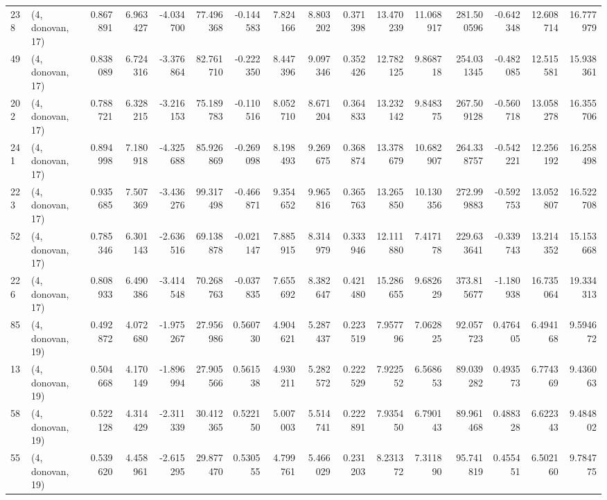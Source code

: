 \begin{tabular}{llrrrrrrrrrrrrrr}
238 &  (4, donovan, 17) &   0.867891 &   6.963427 & -4.034700 &   77.496368 & -0.144583 &   7.824166 &   8.803202 &  0.371398 &  13.470239 &  11.068917 &  281.500596 & -0.642348 &  12.608714 &  16.777979 \\
49  &  (4, donovan, 17) &   0.838089 &   6.724316 & -3.376864 &   82.761710 & -0.222350 &   8.447396 &   9.097346 &  0.352426 &  12.782125 &   9.868718 &  254.031345 & -0.482085 &  12.515581 &  15.938361 \\
202 &  (4, donovan, 17) &   0.788721 &   6.328215 & -3.216153 &   75.189783 & -0.110516 &   8.052710 &   8.671204 &  0.364833 &  13.232142 &   9.848375 &  267.509128 & -0.560718 &  13.058278 &  16.355706 \\
241 &  (4, donovan, 17) &   0.894998 &   7.180918 & -4.325688 &   85.926869 & -0.269098 &   8.198493 &   9.269675 &  0.368874 &  13.378679 &  10.682907 &  264.338757 & -0.542221 &  12.256192 &  16.258498 \\
223 &  (4, donovan, 17) &   0.935685 &   7.507369 & -3.436276 &   99.317498 & -0.466871 &   9.354652 &   9.965816 &  0.365763 &  13.265850 &  10.130356 &  272.999883 & -0.592753 &  13.052807 &  16.522708 \\
52  &  (4, donovan, 17) &   0.785346 &   6.301143 & -2.636516 &   69.138878 & -0.021147 &   7.885915 &   8.314979 &  0.333946 &  12.111880 &   7.417178 &  229.633641 & -0.339743 &  13.214352 &  15.153668 \\
226 &  (4, donovan, 17) &   0.808933 &   6.490386 & -3.414548 &   70.268763 & -0.037835 &   7.655692 &   8.382647 &  0.421480 &  15.286655 &   9.682629 &  373.815677 & -1.180938 &  16.735064 &  19.334313 \\
85  &  (4, donovan, 19) &   0.492872 &   4.072680 & -1.975267 &   27.956986 &  0.560730 &   4.904621 &   5.287437 &  0.223519 &   7.957796 &   7.062825 &   92.057723 &  0.476405 &   6.494168 &   9.594672 \\
13  &  (4, donovan, 19) &   0.504668 &   4.170149 & -1.896994 &   27.905566 &  0.561538 &   4.930211 &   5.282572 &  0.222529 &   7.922552 &   6.568653 &   89.039282 &  0.493573 &   6.774369 &   9.436063 \\
58  &  (4, donovan, 19) &   0.522128 &   4.314429 & -2.311339 &   30.412365 &  0.522150 &   5.007003 &   5.514741 &  0.222891 &   7.935450 &   6.790143 &   89.961468 &  0.488328 &   6.622343 &   9.484802 \\
55  &  (4, donovan, 19) &   0.539620 &   4.458961 & -2.615295 &   29.877470 &  0.530555 &   4.799761 &   5.466029 &  0.231203 &   8.231372 &   7.311890 &   95.741819 &  0.455451 &   6.502160 &   9.784775 \\

\end{tabular}
